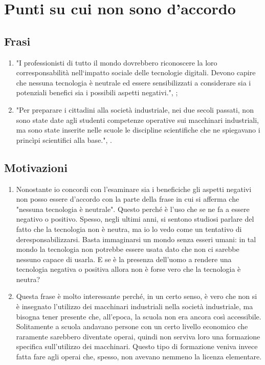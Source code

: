 \section{Punti su cui non sono d'accordo}
\subsection{Frasi}
\begin{enumerate}
    \item "I professionisti di tutto il mondo dovrebbero riconoscere la loro corresponsabilità
    nell‘impatto sociale delle tecnologie digitali. Devono capire che nessuna tecnologia è
    neutrale ed essere sensibilizzati a considerare sia i potenziali benefici sia i possibili aspetti
    negativi.", \textbf{};
    \item "Per preparare i cittadini alla società industriale, nei due secoli passati, non sono state date agli studenti competenze operative sui macchinari industriali, ma sono state inserite nelle scuole le discipline scientifiche che ne spiegavano i princìpi scientifici alla base.", . 
\end{enumerate}

\subsection{Motivazioni}
\begin{enumerate}
    \item Nonostante io concordi con l'esaminare sia i beneficiche gli aspetti negativi non posso
    essere d'accordo con la parte della frase in cui si afferma che "nessuna tecnologia è neutrale".
    Questo perché è l'uso che se ne fa a essere negativo o positivo. Spesso, negli ultimi anni, si sentono
    studiosi parlare del fatto che la tecnologia non è neutra, ma io lo vedo come un tentativo di deresponsabilizzarsi.
    Basta immaginarsi un mondo senza esseri umani: in tal mondo la tecnologia non potrebbe essere usata dato che non ci
    sarebbe nessuno capace di usarla. E se è la presenza dell'uomo a rendere una tecnologia negativa o positiva allora 
    non è forse vero che la tecnologia è neutra?
    \item Questa frase è molto interessante perché, in un certo senso, è vero che non si è insegnato l'utilizzo dei macchinari 
    industriali nella società industriale, ma bisogna tener presente che, all'epoca, la scuola non era ancora così accessibile.
    Solitamente a scuola andavano persone con un certo livello economico che raramente sarebbero diventate operai, quindi non 
    serviva loro una formazione specifica sull'utilizzo dei macchinari. Questo tipo di formazione veniva invece fatta fare agli
    operai che, spesso, non avevano nemmeno la licenza elementare.
\end{enumerate}

